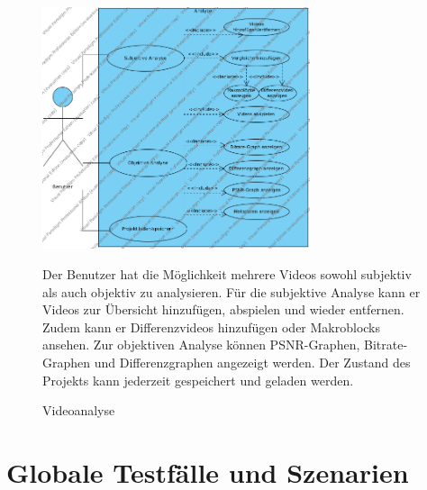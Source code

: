 \documentclass[parskip=full]{scrartcl}
\begin{document}
\begin{figure}[htbp]
{\centering
\includegraphics[width=0.7\textwidth]{UsecaseDiagrams/Analyse.png}
\caption{Videoanalyse} }

Der Benutzer hat die Möglichkeit mehrere Videos sowohl subjektiv als auch objektiv zu analysieren. Für die subjektive Analyse kann er Videos zur Übersicht hinzufügen, abspielen und wieder entfernen. Zudem kann er Differenzvideos hinzufügen oder Makroblocks ansehen.
Zur objektiven Analyse können PSNR-Graphen, Bitrate-Graphen und Differenzgraphen angezeigt werden.
Der Zustand des Projekts kann jederzeit gespeichert und geladen werden.

\end{figure}
\newpage
\section{Globale Testfälle und Szenarien}
\end{document}
